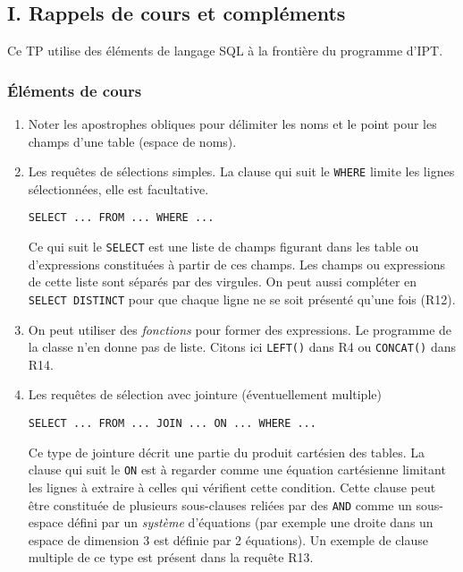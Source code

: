 \subsection*{I. Rappels de cours et compléments}
Ce TP utilise des éléments de langage SQL à la frontière du programme d'IPT. 
\subsubsection*{\'Eléments de cours}
\begin{enumerate}
  \item Noter les apostrophes obliques pour délimiter les noms et le point pour les champs d'une table (espace de noms).
  \item Les requêtes de sélections simples. La clause qui suit le \texttt{WHERE} limite les lignes sélectionnées, elle est facultative. 
\begin{verbatim}
SELECT ... FROM ... WHERE ...  
\end{verbatim}
Ce qui suit le \texttt{SELECT} est une liste de champs figurant dans les table ou d'expressions constituées à partir de ces champs. Les champs ou expressions de cette liste sont séparés par des virgules. On peut aussi compléter en \texttt{SELECT DISTINCT} pour que chaque ligne ne se soit présenté qu'une fois (R12).

\item On peut utiliser des \emph{fonctions} pour former des expressions. Le programme de la classe n'en donne pas de liste. Citons ici \texttt{LEFT()} dans R4 ou \texttt{CONCAT()} dans R14.

\item Les requêtes de sélection avec jointure (éventuellement multiple)
\begin{verbatim}
SELECT ... FROM ... JOIN ... ON ... WHERE ...  
\end{verbatim}
Ce type de jointure décrit une partie du produit cartésien des tables. La clause qui suit le \texttt{ON} est à regarder comme une équation cartésienne limitant les lignes à extraire à celles qui vérifient cette condition. Cette clause peut être constituée de plusieurs sous-clauses reliées par des \texttt{AND} comme un sous-espace défini par un \emph{système} d'équations (par exemple une droite dans un espace de dimension 3 est définie par 2 équations). Un exemple de clause multiple de ce type est présent dans la requête R13.


\end{enumerate}
